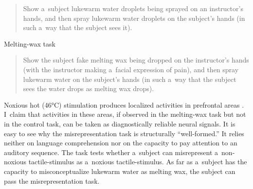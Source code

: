 \begin{quotation}
Show a~subject lukewarm water droplets being sprayed on an instructor's hands, and then spray lukewarm water droplets on the subject's hands (in such a~way that the subject sees it).

\end{quotation}
Melting-wax task


\begin{quotation}
Show the subject fake melting wax being dropped on the instructor's hands (with the instructor making a~facial expression of pain), and then spray lukewarm water on the subject's hands (in such a~way that the subject sees the water drops as melting wax drops).

\end{quotation}
Noxious hot (46°C) stimulation produces localized activities in prefrontal areas
\parencite[][]{tracey_noxious_2000}. %
 I~claim that activities in these areas, if observed in the melting-wax task but not in the control task, can be taken as diagnostically reliable neural signals. It is easy to see why the misrepresentation task is structurally ``well-formed.'' It relies neither on language comprehension nor on the capacity to pay attention to an auditory sequence. The task tests whether a~subject can misrepresent a~non-noxious tactile-stimulus as a~noxious tactile-stimulus. As far as a~subject has the capacity to misconceptualize lukewarm water as melting wax, the subject can pass the misrepresentation task.

